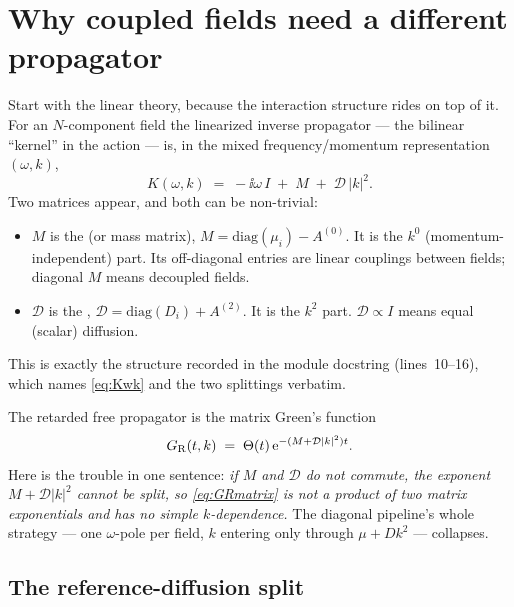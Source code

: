 \section{Why coupled fields need a different propagator}

Start with the linear theory, because the interaction structure rides on top of
it. For an $N$-component field the linearized inverse propagator --- the
bilinear ``kernel'' in the \msrjd{} action --- is, in the mixed
frequency/momentum representation $(\omega,k)$,
\begin{equation}
  K(\omega,k) \;=\; -\ii\omega\,I \;+\; M \;+\; \mathcal{D}\,|k|^{2}.
  \label{eq:Kwk}
\end{equation}
Two matrices appear, and both can be non-trivial:
\begin{itemize}
  \item $M$ is the  (or mass matrix),
        $M=\mathrm{diag}(\mu_{i})-A^{(0)}$. It is the $k^{0}$
        (momentum-independent) part. Its off-diagonal entries are linear
        couplings between fields; diagonal $M$ means decoupled fields.
  \item $\mathcal{D}$ is the ,
        $\mathcal{D}=\mathrm{diag}(D_{i})+A^{(2)}$. It is the $k^{2}$ part.
        $\mathcal{D}\propto I$ means equal (scalar) diffusion.
\end{itemize}
This is exactly the structure recorded in the 
module docstring (lines~10--16), which names \eqref{eq:Kwk} and the two
splittings verbatim.

The retarded free propagator is the matrix Green's function
\begin{equation}
  G_{\mathrm R}(t,k)\;=\;\Theta(t)\,\mathrm{e}^{-(M+\mathcal{D}|k|^{2})t}.
  \label{eq:GRmatrix}
\end{equation}
Here is the trouble in one sentence: \emph{if $M$ and $\mathcal{D}$ do not
commute, the exponent $M+\mathcal{D}|k|^{2}$ cannot be split, so
\eqref{eq:GRmatrix} is not a product of two matrix exponentials and has no
simple $k$-dependence.} The diagonal pipeline's whole strategy --- one
$\omega$-pole per field, $k$ entering only through $\mu+Dk^{2}$ --- collapses.

\subsection{The reference-diffusion split}

